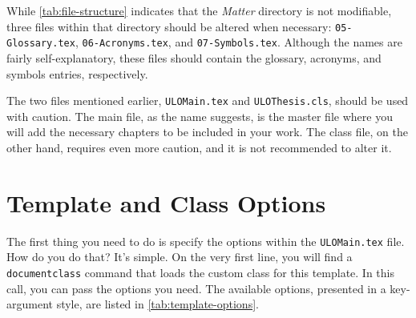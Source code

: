 \begin{block}[note]
    While \autoref{tab:file-structure} indicates that the \textit{Matter} directory is not modifiable, three files within that directory should be altered when necessary: \texttt{05-Glossary.tex}, \texttt{06-Acronyms.tex}, and \texttt{07-Symbols.tex}. Although the names are fairly self-explanatory, these files should contain the glossary, acronyms, and symbols entries, respectively.
\end{block}

The two files mentioned earlier, \texttt{ULOMain.tex} and \texttt{ULOThesis.cls}, should be used with caution. The main file, as the name suggests, is the master file where you will add the necessary chapters to be included in your work. The class file, on the other hand, requires even more caution, and it is not recommended to alter it.

\section{Template and Class Options}
\label{sec:class-options}
The first thing you need to do is specify the options within the \texttt{ULOMain.tex} file. How do you do that? It's simple. On the very first line, you will find a \texttt{documentclass} command that loads the custom class for this template. In this call, you can pass the options you need. The available options, presented in a key-argument style, are listed in \autoref{tab:template-options}.

